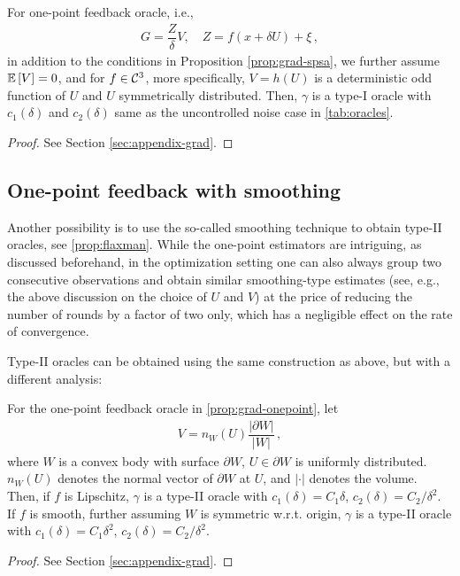 \begin{proposition}
\label{prop:grad-onepoint}
For one-point feedback oracle, i.e.,
\begin{align*}
G = \dfrac{Z}{\delta}V, \quad Z=f(x+\delta U)+\xi\,,
\end{align*}
in addition to the conditions in Proposition \ref{prop:grad-spsa}, we further assume $\mathbb{E}\left[V\right]=0$,
and for $f \in \mathcal{C}^3$, more specifically, $V=h(U)$ is a deterministic odd function of $U$ and $U$ symmetrically distributed. Then, $\gamma$ is a type-I oracle with $c_1(\delta)$ and $c_2(\delta)$ same as the uncontrolled noise case in \cref{tab:oracles}.
\end{proposition}
\begin{proof}
See Section \ref{sec:appendix-grad}.
\end{proof}

\subsection{One-point feedback with smoothing}
Another possibility is to use the so-called smoothing technique
\citep{PoTsy90,flaxman2005online,HaLe14:SOC}
to obtain type-II oracles, see \cref{prop:flaxman}.
While the one-point estimators are intriguing, as discussed beforehand,
in the optimization setting one can also always group two consecutive observations and obtain similar smoothing-type estimates (see, e.g., the above discussion on the choice of $U$ and $V$)
at the price of reducing the number of rounds by a factor of two only, which has a negligible effect on the rate of convergence.

Type-II oracles can be obtained using the same construction as above, but with a different analysis:
\begin{proposition}
\label{prop:flaxman}
For the one-point feedback oracle in \cref{prop:grad-onepoint}, let
\begin{align*}
V = n_W(U)\dfrac{\lvert \partial W\rvert}{\lvert W \rvert}\,,
\end{align*}
where $W$ is a convex body with surface $\partial W$, $U \in \partial W$ is uniformly distributed. $n_W(U)$ denotes the normal vector of $\partial W$ at $U$, and $\lvert \cdot \rvert$ denotes the volume.
Then, if $f$ is Lipschitz, $\gamma$ is a type-II oracle with $c_1(\delta)=C_1 \delta$, $c_2(\delta) = C_2/\delta^2$.
If $f$ is smooth, further assuming $W$ is symmetric w.r.t. origin, $\gamma$ is a type-II oracle with $c_1(\delta) = C_1\delta^2$, $c_2(\delta) = C_2/\delta^2$.
\end{proposition}
\begin{proof}
See Section \ref{sec:appendix-grad}.
\end{proof}


